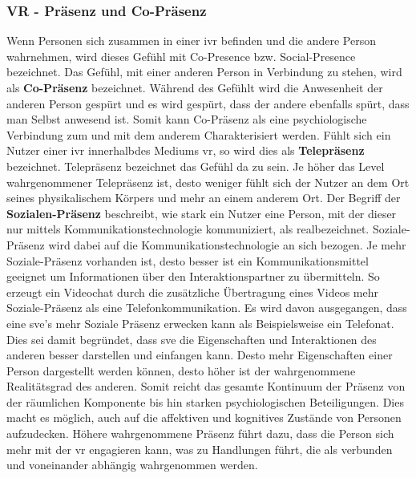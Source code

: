 \documentclass[a4paper,11pt]{article}%
\renewcommand{\\}{\vspace*{0.5\baselineskip} \newline}
\begin{document}
		\subsubsection{VR - Präsenz und Co-Präsenz}
Wenn Personen sich zusammen in einer \ac{ivr} befinden und die andere Person wahrnehmen, wird dieses Gefühl mit  \grqq Co-Presence bzw. Social-Presence \glqq bezeichnet. \citep{schuemie2001research}\\
Das Gefühl, mit einer anderen Person in Verbindung zu stehen, wird als \textbf{Co-Präsenz} bezeichnet. Während des Gefühlt wird die Anwesenheit der anderen Person gespürt und es wird gespürt, dass der andere ebenfalls spürt, dass man Selbst anwesend ist. Somit kann Co-Präsenz als eine psychiologische Verbindung zum und mit dem anderem Charakterisiert werden.  \\
Fühlt sich ein Nutzer einer \ac{ivr} \flqq innerhalb\frqq des Mediums \ac{vr}, so wird dies als \textbf{Telepräsenz} bezeichnet. Telepräsenz bezeichnet das Gefühl \flqq da zu sein\frqq. Je höher das Level wahrgenommener Telepräsenz ist, desto weniger fühlt sich der Nutzer an dem Ort seines physikalischem Körpers und mehr an einem anderem Ort. \citep[p.482]{nowak2004effect}\\
Der Begriff der \flqq \textbf{Sozialen-Präsenz} \frqq beschreibt, wie stark ein Nutzer eine Person, mit der dieser nur mittels Kommunikationstechnologie kommuniziert, als \flqq real\frqq bezeichnet. Soziale-Präsenz wird dabei auf die Kommunikationstechnologie an sich bezogen. Je mehr Soziale-Präsenz vorhanden ist, desto besser ist ein Kommunikationsmittel geeignet um Informationen über den Interaktionspartner zu übermitteln. So erzeugt ein Videochat durch die zusätzliche Übertragung eines Videos mehr Soziale-Präsenz als eine Telefonkommunikation.  \citep[p.151]{gunawardena1995social}
Es wird davon ausgegangen, dass eine \ac{sve}'s mehr Soziale Präsenz erwecken kann als Beispielsweise ein Telefonat. Dies sei damit begründet, dass \ac{sve} die Eigenschaften und Interaktionen des anderen besser darstellen und einfangen kann. Desto mehr Eigenschaften einer Person dargestellt werden können, desto höher ist der wahrgenommene Realitätsgrad des anderen. \citep[p. 5-8]{biocca2002defining}
Somit reicht das gesamte Kontinuum der Präsenz von der räumlichen Komponente bis hin starken psychiologischen Beteiligungen. Dies macht es möglich, auch auf die affektiven und kognitives Zustände von Personen aufzudecken. Höhere wahrgenommene Präsenz führt dazu, dass die Person sich mehr mit der \ac{vr} engagieren kann, was zu Handlungen führt, die als verbunden und voneinander abhängig wahrgenommen werden. \citep{biocca2001criteria}
\end{document}
